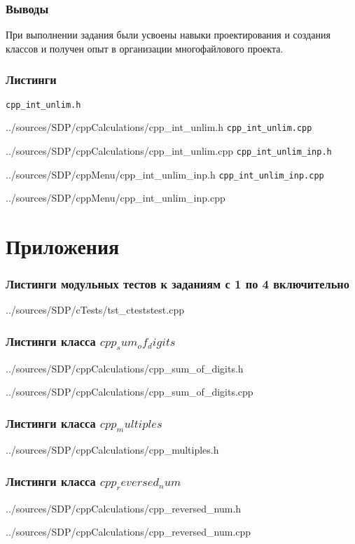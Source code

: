 \documentclass[12pt,a4paper]{report}
\begin{document}
\subsection{Выводы}
\hspace{\parindent}При выполнении задания были усвоены навыки проектирования и создания классов и получен опыт в организации многофайлового проекта.

\newpage
\subsection{Листинги}
\verb+cpp_int_unlim.h+

{../sources/SDP/cppCalculations/cpp_int_unlim.h}
\verb+cpp_int_unlim.cpp+

{../sources/SDP/cppCalculations/cpp_int_unlim.cpp}
\verb+cpp_int_unlim_inp.h+

{../sources/SDP/cppMenu/cpp_int_unlim_inp.h}
\verb+cpp_int_unlim_inp.cpp+

{../sources/SDP/cppMenu/cpp_int_unlim_inp.cpp}

\chapter*{Приложения}
\subsection*{Листинги модульных тестов к заданиям с 1 по 4 включительно}

{../sources/SDP/cTests/tst_cteststest.cpp}
\newpage

\subsection*{Листинги класса $cpp_sum_of_digits$}

{../sources/SDP/cppCalculations/cpp_sum_of_digits.h}

{../sources/SDP/cppCalculations/cpp_sum_of_digits.cpp}
\newpage

\subsection*{Листинги класса $cpp_multiples$}

{../sources/SDP/cppCalculations/cpp_multiples.h}

\newpage

\subsection*{Листинги класса $cpp_reversed_num$}

{../sources/SDP/cppCalculations/cpp_reversed_num.h}

{../sources/SDP/cppCalculations/cpp_reversed_num.cpp}
\newpage
\end{document}
